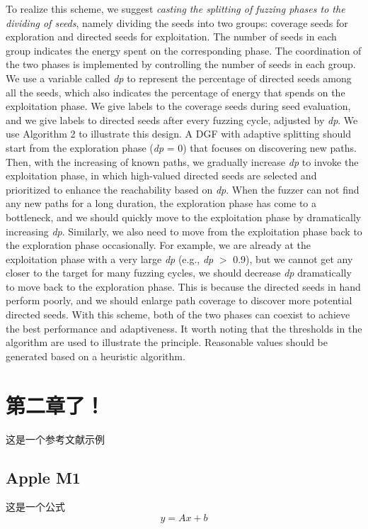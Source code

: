 \documentclass[bachelor]{njupthesis}
\begin{document}
To realize this scheme, we suggest \textit{casting the splitting of fuzzing phases to the dividing of seeds}, namely dividing the seeds into two groups: coverage seeds for exploration and directed seeds for exploitation. The number of seeds in each group indicates the energy spent on the corresponding phase. The coordination of the two phases is implemented by controlling the number of seeds in each group. We use a variable called \textit{dp} to represent the percentage of directed seeds among all the seeds, which also indicates the percentage of energy that spends on the exploitation phase. We give labels to the coverage seeds during seed evaluation, and we give labels to directed seeds after every fuzzing cycle, adjusted by \textit{dp}. 
We use Algorithm 2 to illustrate this design. A DGF with adaptive splitting should start from the exploration phase (\textit{dp} = 0) that focuses on discovering new paths. Then, with the increasing of known paths, we gradually increase \textit{dp} to invoke the exploitation phase, in which high-valued directed seeds are selected and prioritized to enhance the reachability based on \textit{dp}. When the fuzzer can not find any new paths for a long duration, the exploration phase has come to a bottleneck, and we should quickly move to the exploitation phase by dramatically increasing \textit{dp}.
Similarly, we also need to move from the exploitation phase back to the exploration phase occasionally. For example, we are already at the exploitation phase with a very large \textit{dp} (e.g., \textit{dp} $>$ 0.9), but we cannot get any closer to the target for many fuzzing cycles, we should decrease \textit{dp} dramatically to move back to the exploration phase. This is because the directed seeds in hand perform poorly, and we should enlarge path coverage to discover more potential directed seeds. With this scheme, both of the two phases can coexist to achieve the best performance and adaptiveness. 
It worth noting that the thresholds in the algorithm are used to illustrate the principle. Reasonable values should be generated based on a heuristic algorithm.

\chapter{第二章了！}
这是一个参考文献示例\cite{PRODEN}

\section{Apple M1}
这是一个公式
\begin{equation}
	y=A x+b
\end{equation}
\end{document}
